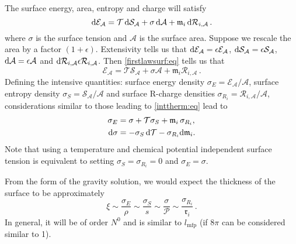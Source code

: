 \documentclass[12pt]{article}
\newcommand{\tloc}{\mathcal{T}}
\newcommand{\eloc}{\mathcal{E}}
\newcommand{\sloc}{\mathcal{S}}
\newcommand{\ploc}{\mathcal{P}}
\newcommand{\rloc}{\mathcal{R}}
\newcommand{\rl}{\mathfrak{r}}
\newcommand{\ml}{\mathfrak{m}}
\newcommand{\mfp}{l_{\mathrm{mfp}}}
\newcommand{\tc}{\mathcal{T_\mathrm{c}}}
\begin{document}
The surface energy, area, entropy and charge will satisfy
%
\begin{equation}\label{firstlawsurf:eq}
  \dr\eloc_\mathcal{A} = \tloc\,\dr\sloc_\mathcal{A} + \sigma\,\dr\mathcal{A} + \ml_i\,\dr\rloc_{i,\mathcal{A}}\,.
\end{equation}
% 
where $\sigma$ is the surface tension and $\mathcal{A}$ is the surface area.
Suppose we rescale the area by a factor $(1+\epsilon)$. 
Extensivity tells us that $\dr\eloc_\mathcal{A}=\epsilon\eloc_\mathcal{A}$, $\dr\sloc_\mathcal{A}=\epsilon\sloc_\mathcal{A}$, $\mathrm{d}\mathcal{A}=\epsilon\mathcal{A}$ and $\dr\rloc_{i,\mathcal{A}}\epsilon\rloc_{i,\mathcal{A}}$.
Then \eqref{firstlawsurf:eq} tells us that
%
\begin{equation*}
  \eloc_\mathcal{A} = \tloc\sloc_\mathcal{A} + \sigma\mathcal{A} + \ml_i\rloc_{i,\mathcal{A}}\,.
\end{equation*}
%
Defining the intensive quantities: surface energy density $\sigma_E=\eloc_\mathcal{A}/\mathcal{A}$, surface entropy density $\sigma_S=\sloc_\mathcal{A}/\mathcal{A}$ and  surface R-charge densities $\sigma_{R_i}=\rloc_{i,\mathcal{A}}/\mathcal{A}$, considerations similar to those leading to \eqref{inttherm:eq} lead to
%
\begin{equation}\label{surftherm:eq}
  \begin{split}
    \sigma_E &= \sigma + \tloc \sigma_S + \ml_i \,\sigma_{R_i},
    \\
    \dr\sigma &= -\sigma_S\, \dr\tloc -\sigma_{R_i} \dr\ml_i.
  \end{split}
\end{equation}
%
Note that using a temperature and chemical potential independent surface tension is equivalent to setting $\sigma_S=\sigma_{R_i}=0$ and $\sigma_E=\sigma$.

From the form of the gravity solution, we would expect the thickness of the surface to be approximately
%
\begin{equation}\label{thick:eq}
  \xi \sim \frac{\sigma_E}{\rho} \sim \frac{\sigma_S}{s} \sim \frac{\sigma}{\ploc} \sim \frac{\sigma_{R_i}}{\rl_i}\,.
\end{equation}
%
In general, it will be of order $N^0$ and is similar to  $\mfp$ (if $8\pi$ can be considered similar to 1).
\end{document}
